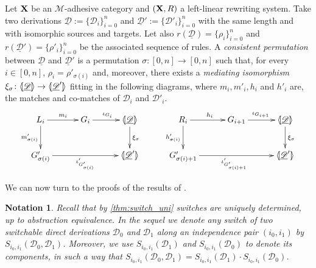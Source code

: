 \documentclass[a4paper,UKenglish,cleveref,pdftex,thm-restate,numberwithinsect]{lipics-v2021}
\def\R{\mathsf{R}}
\def\X{\textbf {\textup{X}}}
\def\G{\textbf {\textup{G}}}
\newcommand{\dder}[1]{\mathscr{#1}}
\newcommand{\der}[1]{\underline{\dder{#1}}}
\newcommand{\lpro}{\langle \hspace{-1.85pt}[}
\newcommand{\rpro}{]\hspace{-1.85pt}\rangle}
\newcommand{\tpro}[1]{\lpro \der{#1}\rpro}
\newtheorem*{notation}{Notation}
\begin{document}
\begin{definition}
	\label{def:permcon}
	Let $\X$ be an $\mathcal{M}$-adhesive category and $(\X, \R)$ 
	a left-linear rewriting system.  Take two derivations $\der{D}:=\{\dder{D}_i\}_{i=0}^n$ and
	$\der{D}':=\{\dder{D}'_i\}_{i=0}^n$ with the same length and with isomorphic sources and targets.
	Let also $r(\der{D})=\{\rho_i\}_{i=0}^n$ and
	$r(\der{D}')=\{\rho'_i\}_{i=0}^n$ be the  associated sequence of rules. 
	A \emph{consistent permutation}
	between $\der{D}$ and
	$\der{D}'$ is a permutation
	$\sigma\colon [0,n]\to [0,n]$ such that, for every $i\in [0,n]$,
	$\rho_i=\rho'_{\sigma(i)}$ and, moreover, there exists a
	\emph{mediating isomorphism}
	$\xi_\sigma\colon \tpro{D} \to \lpro \der{D}' \rpro$ fitting in the
	following diagrams, where $m_i, m'_i, h_i$ and $h'_i$ are, the matches and co-matches of $\dder{D}_i$ and
	$\dder{D}'_i$.
	\[
	\xymatrix@C=30pt{L_i
		\ar[r]^{m_i} \ar[d]_{m'_{\sigma(i)}}& G_i \ar[r]^{\iota_{G_i}}
		&\tpro{D} \ar[d]^{\xi_\sigma} & R_i \ar[r]^{h_i}
		\ar[d]_{h'_{\sigma(i)}}& G_{i+1} \ar[r]^{\iota_{G_{i+1}}}
		&\tpro{D} \ar[d]^{\xi_\sigma} \\G'_{\sigma(i)}
		\ar[rr]_{\iota'_{G'_{\sigma(i)}}}&& \lpro \der{D}' \rpro&
		G'_{\sigma(i)+1} \ar[rr]_{\iota'_{G'_{\sigma(i)+1}}}&& \lpro
		\der{D}' \rpro}
	\]
\end{definition}

We can now turn to the proofs of the results of .

\begin{notation}
  Recall that by \cref{thm:switch_uni} switches are uniquely
  determined, up to abstraction equivalence.
  In the sequel we denote any switch of two switchable direct
  derivations $\dder{D}_0$ and $\dder{D}_1$ along an independence pair
  $(i_0, i_1)$ by $S_{i_0, i_1}(\dder{D}_0, \dder{D}_1)$. Moreover, we
  use $S_{i_0,i_1}(\dder{D}_1)$ and $S_{i_0,i_1}(\dder{D}_0)$ to
  denote its components, in such a way that
  $S_{i_0, i_1}(\dder{D}_0, \dder{D}_1)=S_{i_0,i_1}(\dder{D}_1)\cdot
  S_{i_0,i_1}(\dder{D}_0)$.
\end{notation}


\lemIndepGlobalLeft*
\label{lemIndepGlobalLeft-proof}
\end{document}
